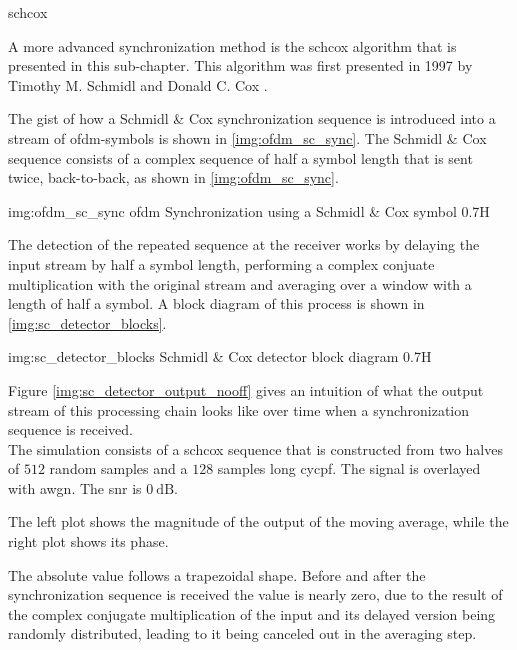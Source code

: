 \begin{subchapter}{\acrlong{schcox}}
  \label{chap:intr_scsync}

  A more advanced synchronization method is
  the \acrlong{schcox} algorithm that is presented
  in this sub-chapter.
  This algorithm was first presented in 1997 by
  Timothy M. Schmidl and Donald C. Cox \cite{schmidlcox}.

  The gist of how a Schmidl \& Cox synchronization sequence
  is introduced into a stream of \gls{ofdm}-symbols is
  shown in \autoref{img:ofdm_sc_sync}.
  The Schmidl \& Cox sequence consists of a complex sequence
  of half a symbol length that is sent twice, back-to-back,
  as shown in \autoref{img:ofdm_sc_sync}.

               {img:ofdm_sc_sync}
               {\acrshort{ofdm} Synchronization using a Schmidl \& Cox symbol}
               {0.7}{H}

  The detection of the repeated sequence at the receiver works by delaying
  the input stream by half a symbol length, performing a complex conjuate
  multiplication with the original stream and averaging over a window with
  a length of half a symbol.
  A block diagram of this process is shown in \autoref{img:sc_detector_blocks}.

               {img:sc_detector_blocks}
               {Schmidl \& Cox detector block diagram}
               {0.7}{H}

  Figure \ref{img:sc_detector_output_nooff} gives an intuition
  of what the output stream of this processing chain looks like
  over time when a synchronization sequence is received. \\

  The simulation consists of a \gls{schcox} sequence
  that is constructed from two halves of $512$ random samples
  and a $128$ samples long \acrlong{cycpf}.
  The signal is overlayed with \acrlong{awgn}.
  The \gls{snr} is $\SI{0}{\deci\bel}$.

  The left plot shows the magnitude of the output of
  the moving average, while the right plot shows its phase.

  The absolute value follows a trapezoidal shape.
  Before and after the synchronization sequence is received
  the value is nearly zero, due to the result of the complex
  conjugate multiplication of the input and its delayed version
  being randomly distributed, leading to it being canceled out
  in the averaging step.


\end{subchapter}
